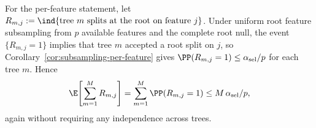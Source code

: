For the per-feature statement, let
$R_{m,j} := \ind\{\text{tree $m$ splits at the root on feature $j$}\}$. Under
uniform root feature subsampling from $p$ available features and the complete
root null, the event $\{R_{m,j}=1\}$ implies that tree $m$ accepted a root split
on $j$, so Corollary~\ref{cor:subsampling-per-feature} gives
$\PP(R_{m,j}=1) \le \alpha_{\mathrm{sel}}/p$ for each tree $m$. Hence
%
\begin{equation}
  \E\!\left[\sum_{m=1}^M R_{m,j}\right]
  = \sum_{m=1}^M \PP(R_{m,j}=1)
  \le M\,\alpha_{\mathrm{sel}}/p,
\end{equation}
%
again without requiring any independence across trees.
